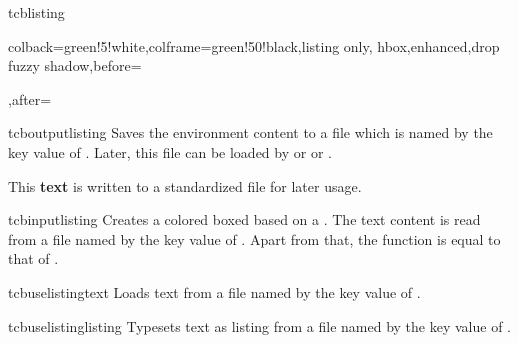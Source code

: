 \begin{docEnvironment}{tcblisting}{}
\begin{dispExample}
\begin{tcblisting}{colback=green!5!white,colframe=green!50!black,listing only,
  hbox,enhanced,drop fuzzy shadow,before=\begin{center},after=\end{center}}
\end{tcblisting}
\end{dispExample}
\end{docEnvironment}


\clearpage
\begin{docEnvironment}{tcboutputlisting}{}
  Saves the environment content to a file which is named by the key value of
  . Later, this file can be loaded by
   or  or .
\begin{dispListing}
\begin{tcboutputlisting}
This \textbf{text} is written to a standardized file for later usage.
\end{tcboutputlisting}
\end{dispListing}
\end{docEnvironment}


\begin{docCommand}{tcbinputlisting}{}
  Creates a colored boxed based on a . The text content is read
  from a file named by the key value of . Apart from that,
  the function is equal to that of .
\begin{dispExample}
\end{dispExample}
\end{docCommand}

\begin{docCommand}{tcbuselistingtext}{}
  Loads text from a file named by the key value of .
\begin{dispExample}
\tcbuselistingtext
\end{dispExample}
\end{docCommand}


\begin{docCommand}{tcbuselistinglisting}{}
  Typesets text as listing from a file named by the key value of .
\begin{dispExample}
\tcbuselistinglisting
\end{dispExample}
\end{docCommand}

